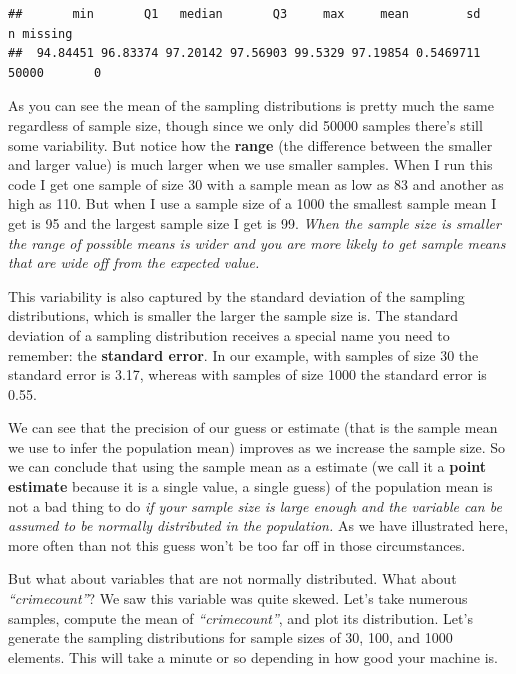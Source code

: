 \documentclass[
]{book}
\begin{document}
\begin{verbatim}
##       min       Q1   median       Q3     max     mean        sd     n missing
##  94.84451 96.83374 97.20142 97.56903 99.5329 97.19854 0.5469711 50000       0
\end{verbatim}

As you can see the mean of the sampling distributions is pretty much the same regardless of sample size, though since we only did 50000 samples there's still some variability. But notice how the \textbf{range} (the difference between the smaller and larger value) is much larger when we use smaller samples. When I run this code I get one sample of size 30 with a sample mean as low as 83 and another as high as 110. But when I use a sample size of a 1000 the smallest sample mean I get is 95 and the largest sample size I get is 99. \emph{When the sample size is smaller the range of possible means is wider and you are more likely to get sample means that are wide off from the expected value.}

This variability is also captured by the standard deviation of the sampling distributions, which is smaller the larger the sample size is. The standard deviation of a sampling distribution receives a special name you need to remember: the \textbf{standard error}. In our example, with samples of size 30 the standard error is 3.17, whereas with samples of size 1000 the standard error is 0.55.

We can see that the precision of our guess or estimate (that is the sample mean we use to infer the population mean) improves as we increase the sample size. So we can conclude that using the sample mean as a estimate (we call it a \textbf{point estimate} because it is a single value, a single guess) of the population mean is not a bad thing to do \emph{if your sample size is large enough and the variable can be assumed to be normally distributed in the population.} As we have illustrated here, more often than not this guess won't be too far off in those circumstances.

But what about variables that are not normally distributed. What about \emph{``crimecount''}? We saw this variable was quite skewed. Let's take numerous samples, compute the mean of \emph{``crimecount''}, and plot its distribution. Let's generate the sampling distributions for sample sizes of 30, 100, and 1000 elements. This will take a minute or so depending in how good your machine is.
\end{document}

